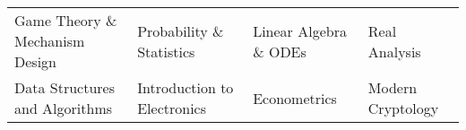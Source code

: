 {\fontsize{10.5pt}{1.3em}\bodyfont\upshape\color{text}
  \vspace{4mm}
  \begin{tabular*}{\textwidth}{l l l l}
    Game Theory \& Mechanism Design & Probability \& Statistics & Linear Algebra \& ODEs  & Real Analysis\\
    Data Structures and Algorithms & Introduction to Electronics & Econometrics & Modern Cryptology \\
    
\end{tabular*}
}\\\\
\vspace{-0.3cm}
